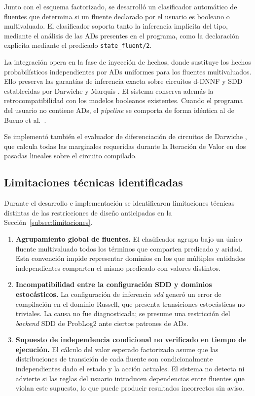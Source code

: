 Junto con el esquema factorizado, se desarrolló un clasificador automático de fluentes
que determina si un fluente declarado por el
usuario es booleano o multivaluado. El clasificador soporta tanto la
inferencia implícita del tipo, mediante el análisis de las ADs presentes en
el programa, como la declaración explícita mediante el predicado
\texttt{state\_fluent/2}.

La integración opera en la fase de inyección de hechos, donde
sustituye los hechos probabilísticos independientes por ADs uniformes para
los fluentes multivaluados. Ello preserva las garantías de inferencia exacta
sobre circuitos d-DNNF y SDD establecidas por Darwiche y Marquis
\cite{darwiche2002knowledge, fierens2015inference}. El sistema conserva
además la retrocompatibilidad con los modelos booleanos existentes. Cuando
el programa del usuario no contiene ADs, el \textit{pipeline} se comporta
de forma idéntica al de Bueno et al.\ \cite{bueno2016mdp}.

Se implementó también el evaluador de diferenciación de circuitos de
Darwiche \cite{darwiche2003differential}, que calcula todas las marginales
requeridas durante la Iteración de Valor en dos pasadas lineales sobre el
circuito compilado. 

\subsection{Limitaciones técnicas identificadas}
\label{sec:conclusiones-limitaciones}

Durante el desarrollo e implementación se identificaron limitaciones técnicas
distintas de las restricciones de diseño anticipadas en la
Sección~\ref{subsec:limitaciones}.

\begin{enumerate}
    \item \textbf{Agrupamiento global de fluentes.} El clasificador agrupa
    bajo un único fluente multivaluado todos los términos que comparten
    predicado y aridad. Esta convención impide representar dominios en los
    que múltiples entidades independientes comparten el mismo predicado con
    valores distintos.

    \item \textbf{Incompatibilidad entre la configuración SDD y dominios
    estocásticos.} La configuración de inferencia \textit{sdd} generó un
    error de compilación en el dominio Russell, que presenta transiciones
    estocásticas no triviales. La causa no fue diagnosticada; se presume una
    restricción del \textit{backend} SDD de ProbLog2 ante ciertos patrones
    de ADs.

    \item \textbf{Supuesto de independencia condicional no verificado en
    tiempo de ejecución.} El cálculo del valor esperado factorizado asume
    que las distribuciones de transición de cada fluente son condicionalmente
    independientes dado el estado y la acción actuales. El sistema no
    detecta ni advierte si las reglas del usuario introducen dependencias
    entre fluentes que violan este supuesto, lo que puede producir
    resultados incorrectos sin aviso.
\end{enumerate}

